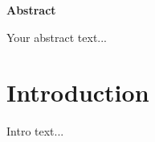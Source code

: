\documentclass{scrartcl}
\theoremstyle{definition}
\begin{document}
\begin{center}
  {\Large\bfseries Abstract}
\end{center}

\vspace{1em}

\noindent
Your abstract text...

\pagebreak
\tableofcontents

\pagebreak
\section{Introduction}
Intro text...








\end{document}
